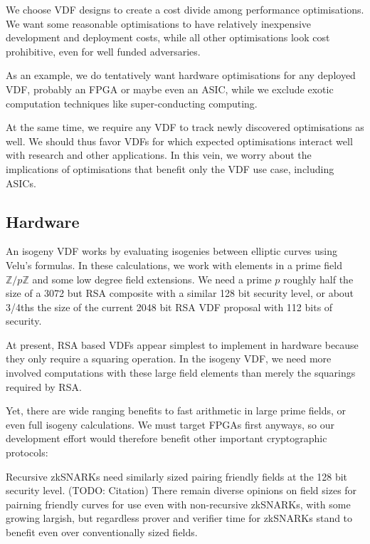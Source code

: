 \documentclass{article}
\newcommand{\Z}{\mathbb{Z}}
\begin{document}
We choose VDF designs to create a cost divide among performance
optimisations.  We want some reasonable optimisations to have
relatively inexpensive development and deployment costs, while
all other optimisations look cost prohibitive, even for well funded
adversaries.

As an example, we do tentatively want hardware optimisations for
any deployed VDF, probably an FPGA or maybe even an ASIC, while we
exclude exotic computation techniques like super-conducting computing.

At the same time, we require any VDF to track newly discovered
optimisations as well.  We should thus favor VDFs for which expected
optimisations interact well with research and other applications.
In this vein, we worry about the implications of optimisations that
benefit only the VDF use case, including ASICs.

\subsection{Hardware}

An isogeny VDF works by evaluating isogenies between elliptic curves
using Velu's formulas.  In these calculations, we work with elements
in a prime field $\Z/p\Z$ and some low degree field extensions. 
We need a prime $p$ roughly half the size of a 3072 but RSA composite
with a similar 128 bit security level, or about 3/4ths the size of the
current 2048 bit RSA VDF proposal with 112 bits of security.

At present, RSA based VDFs appear simplest to implement in hardware
because they only require a squaring operation. %
In the isogeny VDF, we need more involved computations with these
large field elements than merely the squarings required by RSA. 

Yet, there are wide ranging benefits to fast arithmetic in large
prime fields, or even full isogeny calculations.  We must target
FPGAs first anyways, so our development effort would therefore
benefit other important cryptographic protocols:
 
Recursive zkSNARKs need similarly sized pairing friendly fields at
the 128 bit security level.  (TODO: Citation)
There remain diverse opinions on field sizes for pairning friendly
curves for use even with non-recursive zkSNARKs, with some growing
largish, but regardless prover and verifier time for zkSNARKs stand
to benefit even over conventionally sized fields.  
\end{document}
